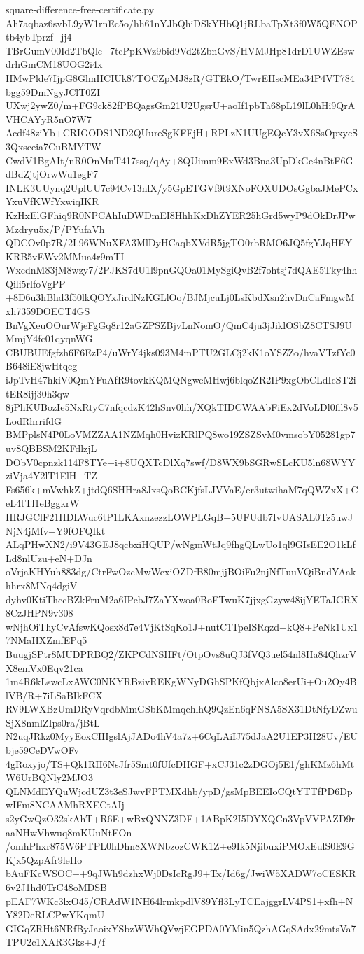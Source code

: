 \documentclass[11pt]{article}
\theoremstyle{definition}
\theoremstyle{remark}
\begin{document}
\begin{filecontents*}[overwrite]{square-difference-free-certificate.py}
Ah7aqbaz6svbL9yW1rnEc5o/hh61nYJbQhiDSkYHbQ1jRLbaTpXt3f0W5QENOPtb4ybTprzf+jj4
TBrGumV00Id2TbQlc+7tcPpKWz9bid9Vd2tZbnGvS/HVMJHp81drD1UWZEswdrhGmCM18UOG2i4x
HMwPlde7IjpG8GhnHCIUk87TOCZpMJ8zR/GTEkO/TwrEHscMEa34P4VT784bgg59DmNgyJClT0ZI
UXwj2ywZ0/m+FG9ck82fPBQagsGm21U2UgsrU+aoIf1pbTa68pL19lL0hHi9QrAVHCAYyR5nO7W7
Acdf48ziYb+CRIGODS1ND2QUureSgKFFjH+RPLzN1UUgEQcY3vX6SsOpxycS3Qxsceia7CuBMYTW
CwdV1BgAIt/nR0OnMnT417ssq/qAy+8QUimm9ExWd3Bna3UpDkGe4nBtF6GdBdZjtjOrwWu1egF7
INLK3UUynq2UplUU7c94Cv13nlX/y5GpETGVf9t9XNoFOXUDOsGgbaJMePCxYxuVfKWfYxwiqIKR
KzHxElGFhiq9R0NPCAhIuDWDmEI8HhhKxDhZYER25hGrd5wyP9dOkDrJPwMzdryu5x/P/PYufaVh
QDCOv0p7R/2L96WNuXFA3MlDyHCaqbXVdR5jgTO0rbRMO6JQ5fgYJqHEYKRB5vEWv2MMua4r9mTI
WxcdnM83jM8wzy7/2PJKS7dU1l9pnGQOa01MySgiQvB2f7ohtsj7dQAE5Tky4hhQili5rlfoVgPP
+8D6u3hBhd3f50lkQOYxJirdNzKGLlOo/BJMjcuLj0LsKbdXsn2hvDnCaFmgwMxh7359DOECT4GS
BnVgXeuOOurWjeFgGq8r12aGZPSZBjvLnNomO/QmC4ju3jJiklOSbZ8CTSJ9UMmjY4fc01qyqnWG
CBUBUEfgfzh6F6EzP4/uWrY4jks093M4mPTU2GLCj2kK1oYSZZo/hvaVTzfYc0B648iE8jwHtqcg
iJpTvH47hkiV0QmYFuAfR9tovkKQMQNgweMHwj6blqoZR2IP9xgObCLdIcST2itER8ijj30h3qw+
8jPhKUBozIe5NxRtyC7nfqcdzK42hSnv0hh/XQkTIDCWAAbFiEx2dVoLDl0fil8v5LodRhrrifdG
BMPplsN4P0LoVMZZAA1NZMqh0HvizKRlPQ8wo19ZSZSvM0vmsobY05281gp7uv8QBBSM2KFdlzjL
DObV0cpnzk114F8TYe+i+8UQXTcDlXq7swf/D8WX9bSGRwSLcKU5ln68WYYziVja4Y2lT1ElH+TZ
Fs656k+mVwhkZ+jtdQ6SHHra8JxsQoBCKjfsLJVVaE/er3utwihaM7qQWZxX+CeL4tTl1eBggkrW
HRJGClF21HDLWuc6tP1LKAxnzezzLOWPLGqB+5UFUdb7IvUASAL0Tz5uwJNjN4jMfv+Y9fOFQIkt
ALqPHwXN2/i9V43GEJ8qcbxiHQUP/wNgmWtJq9fhgQLwUo1ql9GIsEE2O1kLfLd8nlUzu+eN+DJn
oVrjaKHYuh883dg/CtrFwOzcMwWexiOZDfB80mjjBOiFu2njNfTuuVQiBndYAakhhrx8MNq4dgiV
dyhv0KtiThccBZkFruM2a6IPebJ7ZaYXwoa0BoFTwuK7jjxgGzyw48ijYETaJGRX8CzJHPN9v308
wNjhOiThyCvAfswKQosx8d7e4VjKtSqKo1J+nutC1TpeISRqzd+kQ8+PeNk1Ux17NMaHXZmfEPq5
BuugjSPtr8MUDPRBQ2/ZKPCdNSHFt/OtpOvs8uQJ3fVQ3uel54nl8Ha84QhzrVX8emVx0Eqv21ca
1m4R6kLswcLxAWC0NKYRBzivREKgWNyDGhSPKfQbjxAlco8erUi+Ou2Oy4BlVB/R+7iLSaBIkFCX
RV9LWXBzUmDRyVqrdbMmGSbKMmqehlhQ9QzEn6qFNSA5SX31DtNfyDZwuSjX8nmlZIps0ra/jBtL
N2uqJRkz0MyyEoxCIHgslAjJADo4hV4a7z+6CqLAiIJ75dJaA2U1EP3H28Uv/EUbje59CeDVwOFv
4gRoxyjo/TS+Qk1RH6NsJfr5Smt0fUfcDHGF+xCJ31c2zDGOj5E1/ghKMz6hMtW6UrBQNly2MJO3
QLNMdEYQuWjcdUZ3t3eSJwvFPTMXdhb/ypD/gsMpBEEIoCQtYTTfPD6DpwIFm8NCAAMhRXECtAIj
s2yGwQzO32skAhT+R6E+wBxQNNZ3DF+1ABpK2I5DYXQCn3VpVVPAZD9raaNHwVhwuq8mKUuNtEOn
/omhPhxr875W6PTPL0hDhn8XWNbzozCWK1Z+e9Ik5NjibuxiPMOxEulS0E9GKjx5QzpAfr9leIIo
bAuFKcWSOC++9qJWh9dzhxWj0DsIcRgJ9+Tx/Id6g/JwiW5XADW7oCESKR6v2J1hd0TrC48oMDSB
pEAF7WKc3lxO45/CRAdW1NH64lrmkpdlV89Yfl3LyTCEajggrLV4PS1+xfh+NY82DeRLCPwYKqmU
GIGqZRHt6NRfByJaoixYSbzWWhQVwjEGPDA0YMin5QzhAGqSAdx29mtsVa7TPU2c1XAR3Gks+J/f

\end{filecontents*}
\end{document}
